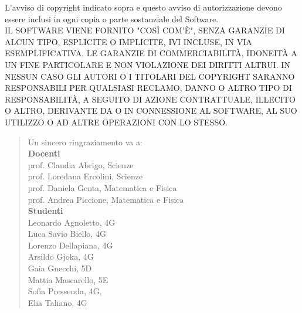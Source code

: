 \documentclass{article}
\begin{document}
L'avviso di copyright indicato sopra e questo avviso di autorizzazione devono essere inclusi in ogni copia o parte sostanziale del Software.\\

IL SOFTWARE VIENE FORNITO "COSÌ COM'È", SENZA GARANZIE DI ALCUN TIPO, ESPLICITE O IMPLICITE, IVI INCLUSE, IN VIA ESEMPLIFICATIVA, LE GARANZIE DI COMMERCIABILITÀ, IDONEITÀ A UN FINE PARTICOLARE E NON VIOLAZIONE DEI DIRITTI ALTRUI. IN NESSUN CASO GLI AUTORI O I TITOLARI DEL COPYRIGHT SARANNO RESPONSABILI PER QUALSIASI RECLAMO, DANNO O ALTRO TIPO DI RESPONSABILITÀ, A SEGUITO DI AZIONE CONTRATTUALE, ILLECITO O ALTRO, DERIVANTE DA O IN CONNESSIONE AL SOFTWARE, AL SUO UTILIZZO O AD ALTRE OPERAZIONI CON LO STESSO.
\pagebreak
\renewcommand{\abstractname}{Riconoscimenti}
\begin{center}
\begin{abstract}
Un sincero ringraziamento va a:\\
\textbf{Docenti}\\
 prof. Claudia Abrigo, Scienze\\
 prof. Loredana Ercolini, Scienze\\
 prof. Daniela Genta, Matematica e Fisica\\
 prof. Andrea Piccione, Matematica e Fisica\\
\textbf{Studenti}\\
Leonardo Agnoletto, 4G\\
Luca Savio Biello, 4G\\
Lorenzo Dellapiana, 4G\\
Arsildo Gjoka, 4G\\
Gaia Gnecchi, 5D\\
Mattia Mascarello, 5E\\
Sofia Pressenda, 4G,\\
Elia Taliano, 4G\\
\end{abstract}
\end{center}
\end{document}
